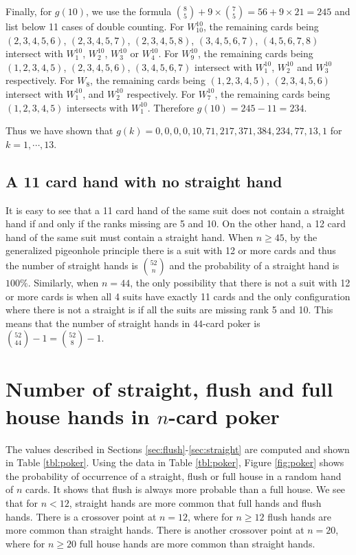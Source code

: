 \documentclass{article}
\begin{document}
Finally, for $g(10)$, we use the formula $\binom{8}{5}+9\times\binom{7}{5}=56+9\times 21=245$ and list below 11 cases of double counting.
For $W_{10}^{10}$, the remaining cards being $(2,3,4,5,6)$, $(2,3,4,5,7)$, $(2,3,4,5,8)$, $(3,4,5,6,7)$, $(4,5,6,7,8)$ intersect with $W_1^{10}$, $W_2^{10}$, $W_3^{10}$ or $W_4^{10}$. 
For $W_9^{10}$, the remaining cards being $(1,2,3,4,5)$, $(2,3,4,5,6)$, $(3,4,5,6,7)$ intersect with $W_1^{10}$, $W_2^{10}$ and $W_3^{10}$ respectively.
For $W_8$, the remaining cards being $(1,2,3,4,5)$, $(2,3,4,5,6)$ intersect with $W_1^{10}$, and $W_2^{10}$ respectively.
For $W_7^{10}$, the remaining cards being $(1,2,3,4,5)$ intersects with $W_1^{10}$.
Therefore $g(10)=245-11=234$.

Thus we have shown that $g(k) = 0,0,0,0,10,71,217,371,384,234,77,13,1$ for $k=1,\cdots, 13$.

\subsection{A 11 card hand with no straight hand}
It is easy to see that a 11 card hand of the same suit does not contain a straight hand if and only if the ranks missing are 5 and 10. On the other hand, a 12 card hand of the same suit must contain a straight hand. 
When $n\geq 45$, by the generalized pigeonhole principle there is a suit with 12 or more cards and thus the number of straight hands is $\binom{52}{n}$ and the probability of a straight hand is $100\%$. Similarly,
when $n=44$, the only possibility that there is not a suit with 12 or more cards is when all 4 suits have exactly 11 cards and the only configuration where there is not a straight is if all the suits are missing rank 5 and 10. This means that the number of straight hands in $44$-card poker is $\binom{52}{44}-1=\binom{52}{8}-1$.

\section{Number of straight, flush and full house hands in $n$-card poker}
The values described in Sections \ref{sec:flush}-\ref{sec:straight} are computed and shown in Table \ref{tbl:poker}. 
Using the data in Table \ref{tbl:poker}, Figure \ref{fig:poker} shows the probability of occurrence of a straight, flush or full house in a random hand of $n$ cards. It shows that flush is always more probable than a full house. We see that for $n < 12$, straight hands are more common that full hands and flush hands. There is a crossover point at $n=12$, where for $n\geq 12$ flush hands are more common than straight hands. There is another crossover point at $n=20$, where for $n\geq 20$ full house hands are more common than straight hands.
\end{document}
